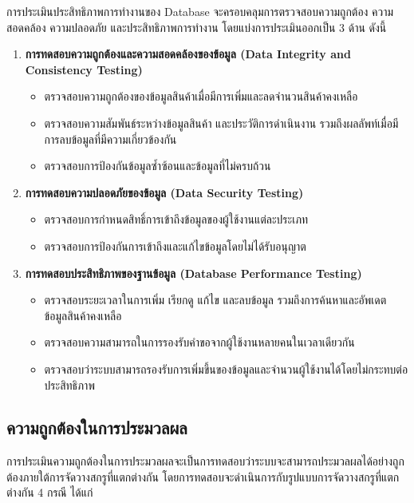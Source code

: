 การประเมินประสิทธิภาพการทำงานของ Database จะครอบคลุมการตรวจสอบความถูกต้อง ความสอดคล้อง ความปลอดภัย และประสิทธิภาพการทำงาน โดยแบ่งการประเมินออกเป็น 3 ด้าน ดังนี้

\begin{enumerate}        
    \item \textbf{การทดสอบความถูกต้องและความสอดคล้องของข้อมูล (Data Integrity and Consistency Testing)} 
          \begin{itemize}        
              \item ตรวจสอบความถูกต้องของข้อมูลสินค้าเมื่อมีการเพิ่มและลดจำนวนสินค้าคงเหลือ
              \item ตรวจสอบความสัมพันธ์ระหว่างข้อมูลสินค้า และประวัติการดำเนินงาน รวมถึงผลลัพท์เมื่อมีการลบข้อมูลที่มีความเกี่ยวข้องกัน
              \item ตรวจสอบการป้องกันข้อมูลซ้ำซ้อนและข้อมูลที่ไม่ครบถ้วน
          \end{itemize}
    \item \textbf{การทดสอบความปลอดภัยของข้อมูล (Data Security Testing)}
          \begin{itemize}        
              \item ตรวจสอบการกำหนดสิทธิ์การเข้าถึงข้อมูลของผู้ใช้งานแต่ละประเภท
              \item ตรวจสอบการป้องกันการเข้าถึงและแก้ไขข้อมูลโดยไม่ได้รับอนุญาต
          \end{itemize}
    \item \textbf{การทดสอบประสิทธิภาพของฐานข้อมูล (Database Performance Testing)}
          \begin{itemize}        
              \item ตรวจสอบระยะเวลาในการเพิ่ม เรียกดู แก้ไข และลบข้อมูล รวมถึงการค้นหาและอัพเดตข้อมูลสินค้าคงเหลือ
              \item ตรวจสอบความสามารถในการรองรับคำขอจากผู้ใช้งานหลายคนในเวลาเดียวกัน
              \item ตรวจสอบว่าระบบสามารถรองรับการเพิ่มขึ้นของข้อมูลและจํานวนผู้ใช้งานได้โดยไม่กระทบต่อประสิทธิภาพ
          \end{itemize}
\end{enumerate}

\subsection{ความถูกต้องในการประมวลผล}

การประเมินความถูกต้องในการประมวลผลจะเป็นการทดสอบว่าระบบจะสามารถประมวลผลได้อย่างถูกต้องภายใต้การจัดวางสกรูที่แตกต่างกัน โดยการทดสอบจะดำเนินการกับรูปแบบการจัดวางสกรูที่แตกต่างกัน 4 กรณี ได้แก่

